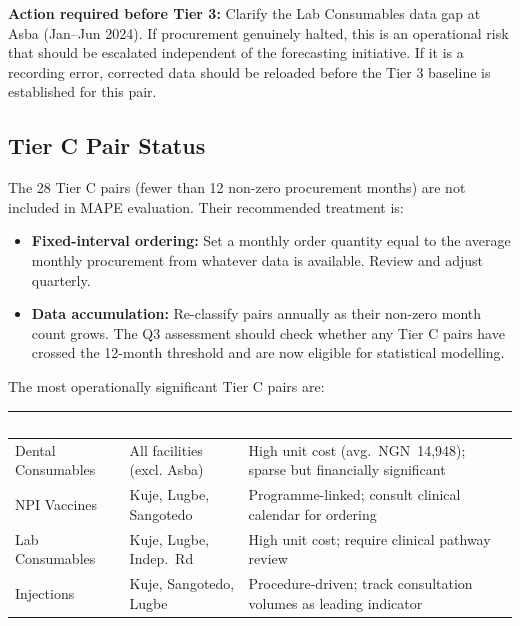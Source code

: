 \documentclass[12pt, a4paper]{article}
\begin{document}
\begin{mdframed}[style=alertbox]
\textbf{Action required before Tier 3:} Clarify the Lab Consumables data
gap at Asba (Jan--Jun 2024). If procurement genuinely halted, this is an
operational risk that should be escalated independent of the forecasting
initiative. If it is a recording error, corrected data should be reloaded
before the Tier 3 baseline is established for this pair.
\end{mdframed}

\subsection{Tier C Pair Status}

The 28 Tier C pairs (fewer than 12 non-zero procurement months) are not
included in MAPE evaluation. Their recommended treatment is:

\begin{itemize}[leftmargin=1.5em, itemsep=3pt]
  \item \textbf{Fixed-interval ordering:} Set a monthly order quantity
        equal to the average monthly procurement from whatever data is
        available. Review and adjust quarterly.
  \item \textbf{Data accumulation:} Re-classify pairs annually as their
        non-zero month count grows. The Q3 assessment should check whether
        any Tier C pairs have crossed the 12-month threshold and are now
        eligible for statistical modelling.
\end{itemize}

The most operationally significant Tier C pairs are:

\vspace{0.4em}
\noindent
\begin{tabularx}{\textwidth}{@{} L{4cm} L{3.5cm} X @{}}
  \toprule
  \textcolor{white}{\textbf{Category}} &
  \textcolor{white}{\textbf{Facility}} &
  \textcolor{white}{\textbf{Note}} \\
  \midrule
  Dental Consumables & All facilities (excl. Asba) &
    High unit cost (avg.\ NGN~14,948); sparse but financially significant \\
  NPI Vaccines       & Kuje, Lugbe, Sangotedo &
    Programme-linked; consult clinical calendar for ordering \\
  Lab Consumables    & Kuje, Lugbe, Indep.\ Rd &
    High unit cost; require clinical pathway review \\
  Injections         & Kuje, Sangotedo, Lugbe &
    Procedure-driven; track consultation volumes as leading indicator \\
  \bottomrule
\end{tabularx}
\end{document}
